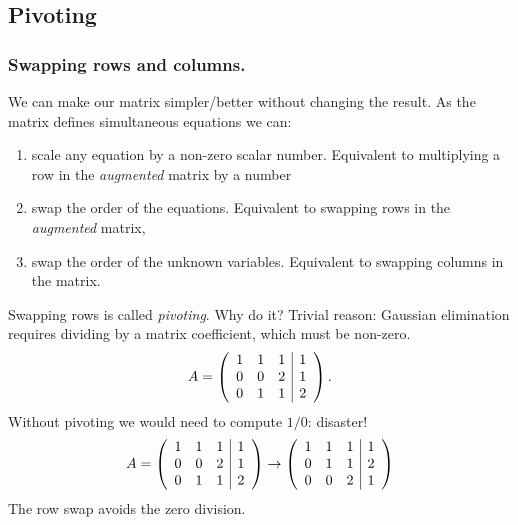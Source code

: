 \documentclass{beamer}
\begin{document}
\begin{frame}
\end{frame}


\subsection{Pivoting}

\begin{frame}
  \frametitle{Swapping rows and columns.}

  We can make our matrix simpler/better without changing the
  result. As the matrix defines simultaneous equations we can: \pause
  \begin{enumerate}
  \item scale any equation by a non-zero scalar number.  Equivalent to
    multiplying a row in the \emph{augmented} matrix by a
    number \pause
  \item swap the order of the equations. Equivalent to
    swapping rows in the \emph{augmented} matrix, \pause
  \item swap the order of the unknown variables.  Equivalent to
    swapping columns in the matrix. \pause
  \end{enumerate}
  \begin{overlayarea}{\textwidth}{0.35\textheight}
    { 
      Swapping rows is called \emph{pivoting}. Why do it? Trivial
      reason: Gaussian elimination requires dividing by a matrix
      coefficient, which must be non-zero.
    }  {
      \begin{equation*}
        A = \left(
          \begin{array}{c c c |c}
            1 & 1 & 1 & 1 \\
            0 & 0 & 2 & 1 \\
            0 & 1 & 1 & 2
          \end{array} \right).
      \end{equation*}
      Without pivoting we would need to compute $1/0$: disaster!
    }
    {
      \begin{equation*}
        A = \left(
          \begin{array}{c c c |c}
            1 & 1 & 1 & 1 \\
            0 & 0 & 2 & 1 \\
            0 & 1 & 1 & 2
          \end{array} \right) \rightarrow
        \left(
          \begin{array}{c c c |c}
            1 & 1 & 1 & 1 \\
            0 & 1 & 1 & 2 \\
            0 & 0 & 2 & 1
          \end{array} \right) 
      \end{equation*}
      The row swap avoids the zero division.
    }      
  \end{overlayarea}

\end{frame}
\end{document}
